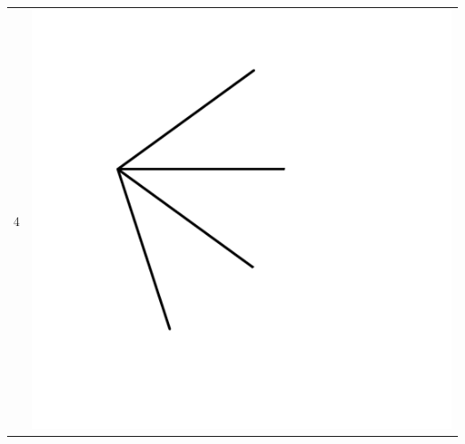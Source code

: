 \documentclass[20pt]{beamer}
\begin{document}
\begin{frame}[plain]
\begin{center}
\begin{tabular}{S D}
4 & \includegraphics[scale=.3]{Figures/4dvec.pdf} \\
\end{tabular}
\end{center}
\end{frame}

\end{document}
